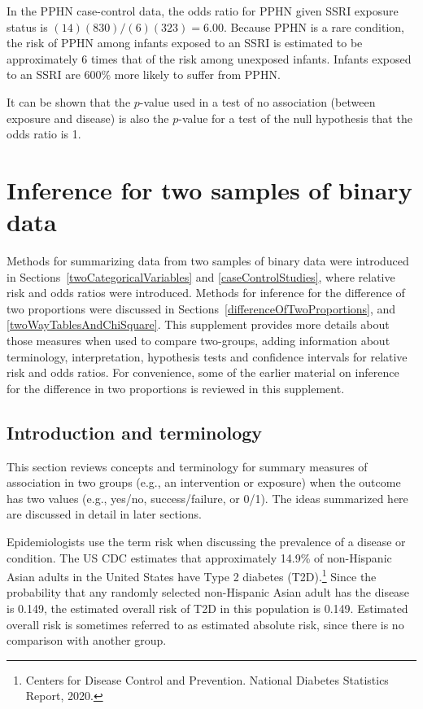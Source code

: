 In the PPHN case-control data, the odds ratio for PPHN given SSRI exposure status is $(14)(830)/(6)(323) = 6.00$.  Because PPHN is a rare condition, the risk of PPHN among infants exposed to an SSRI is estimated to be approximately 6 times that of the risk among unexposed infants.  Infants exposed to an SSRI are 600\% more likely to suffer from PPHN.  

It can be shown that the $p$-value used in a test of no association (between exposure and disease) is also the $p$-value for a test of the null hypothesis that the odds ratio is 1.


  \section{Inference for two samples of binary data} \label{inferenceBinaryData}

Methods for summarizing data from two samples of binary data were introduced in    Sections~\ref{twoCategoricalVariables} and \ref{caseControlStudies}, where relative risk and odds ratios were introduced.  Methods for inference for the difference of two proportions were discussed in Sections~\ref{differenceOfTwoProportions}, and \ref{twoWayTablesAndChiSquare}.  This supplement provides more details about those measures when used to compare two-groups, adding information about terminology, interpretation, hypothesis tests and confidence intervals for relative risk and odds ratios.  For convenience, some of the earlier material on inference for the difference in two proportions is reviewed in this supplement.  


\subsection{Introduction and terminology}
\label{introAndTerminologyForRisk}

This section reviews concepts and terminology for summary measures of association in two groups (e.g., an intervention or exposure) when the outcome has two values (e.g., yes/no, success/failure, or 0/1).  The ideas summarized here are discussed in detail in later sections.

Epidemiologists use the term risk when discussing the prevalence of a disease or condition.  The US CDC estimates that approximately 14.9\% of non-Hispanic Asian adults in the United States have Type 2 diabetes (T2D).\footnote{Centers for Disease Control and Prevention. National Diabetes Statistics Report, 2020.}  Since the probability that any randomly selected non-Hispanic Asian adult has the disease is 0.149, the estimated overall risk of T2D in this population is 0.149. Estimated overall risk is sometimes referred to as estimated absolute risk, since there is no comparison with another group.


